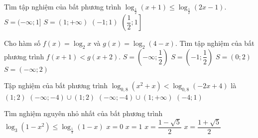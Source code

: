 \begin{ex}%
	Tìm tập nghiệm của bất phương trình $\log_{\tfrac{1}{2}}(x+1)\leq\log_{\tfrac{1}{2}}(2x-1)$. 
	\choice
	{$S=(-\infty;1]$}
	{$S=(1;+\infty)$}
	{$(-1;1)$}
	{\True $\left(\dfrac{1}{2};1\right]$}
\end{ex}
\begin{ex}%
	Cho hàm số $f(x)=\log_2x$ và $g(x)=\log_2(4-x)$. Tìm tập nghiệm của bất phương trình $f(x+1)<g(x+2)$. 
	\choice
	{$S=\left(-\infty;\dfrac{1}{2}\right)$}
	{\True $S=\left(-1;\dfrac{1}{2}\right)$}
	{$S=(0;2)$}
	{$S=(-\infty;2)$}
\end{ex}
\begin{ex}%
	Tập nghiệm của bất phương trình $\log_{0,8}\left(x^2+x\right)<\log_{0,8}(-2x+4)$ là
	\choice
	{$(1;2)$}
	{\True $(-\infty;-4)\cup(1;2)$}
	{$(-\infty;-4)\cup(1;+\infty)$}
	{$(-4;1)$}
\end{ex}
\begin{ex}%
	Tìm nghiệm nguyên nhỏ nhất của bất phương trình $\log_3\left(1-x^2\right)\leq\log_{\tfrac{1}{3}}(1-x)$ 
	\choice
	{\True $x=0$}
	{$x=1$}
	{$x=\dfrac{1-\sqrt{5}}{2}$}
	{$x=\dfrac{1+\sqrt{5}}{2}$}
\end{ex}
